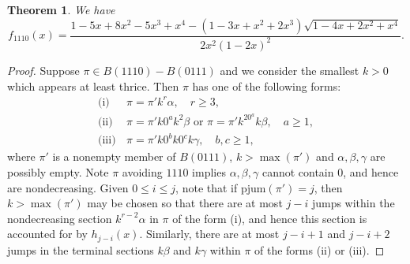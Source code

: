 \documentclass{article}
\theoremstyle{remark}
\theoremstyle{plain}
\newtheorem{theorem}{Theorem}[section]
\begin{document}
\begin{theorem}\label{1110th}
We have
\begin{equation}\label{1110the1}
f_{1110}(x)=\frac{1-5x+8x^2-5x^3+x^4-(1-3x+x^2+2x^3)\sqrt{1-4x+2x^2+x^4}}{2x^2(1-2x)^2}.
\end{equation}
\end{theorem}
\begin{proof}
Suppose $\pi \in B(1110)-B(0111)$ and we consider the smallest $k>0$ which appears at least thrice.  Then $\pi$ has one of the following forms:
\begin{align*}
\text{(i)}&\, \pi=\pi'k^r\alpha, \quad r \geq 3,\\
\text{(ii)}&\,\pi=\pi'k0^ak^2\beta \text{ or } \pi=\pi'k^20^ak\beta, \quad a\geq1,\\
\text{(iii)}&\,\pi=\pi'k0^bk0^ck\gamma, \quad b,c \geq1,
\end{align*}
where $\pi'$ is a nonempty member of $B(0111)$, $k>\max(\pi')$ and $\alpha,\beta,\gamma$ are possibly empty.  Note $\pi$ avoiding $1110$  implies $\alpha,\beta,\gamma$ cannot contain $0$, and hence are nondecreasing.
Given $0 \leq i \leq j$, note that if $\text{pjum}(\pi')=j$, then $k>\max(\pi')$ may be chosen so that there are at most $j-i$ jumps within the nondecreasing section $k^{r-2}\alpha$ in $\pi$ of the form (i), and hence this section is accounted for by $h_{j-i}(x)$.  Similarly, there are at most $j-i+1$ and $j-i+2$ jumps in the terminal sections $k\beta$ and $k\gamma$ within $\pi$ of the forms (ii) or (iii).


\end{proof}
\end{document}
